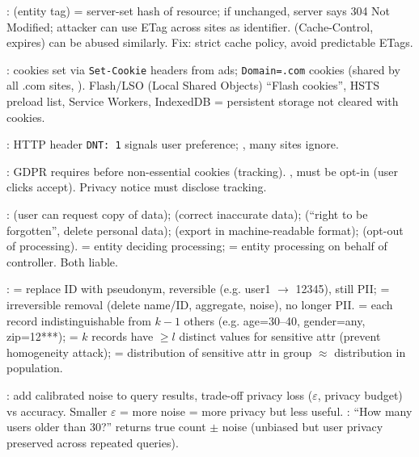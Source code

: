 :  (entity tag) = server-set hash of resource; if unchanged, server says 304 Not Modified; attacker can use ETag across sites as identifier.  (Cache-Control, expires) can be abused similarly. Fix: strict cache policy, avoid predictable ETags.

: cookies set via \texttt{Set-Cookie} headers from ads; \texttt{Domain=.com} cookies (shared by all .com sites, ). Flash/LSO (Local Shared Objects) ``Flash cookies'', HSTS preload list, Service Workers, IndexedDB = persistent storage not cleared with cookies.

: HTTP header \texttt{DNT: 1} signals user preference; , many sites ignore.

: GDPR requires  before non-essential cookies (tracking). , must be opt-in (user clicks accept). Privacy notice must disclose tracking.

:  (user can request copy of data);  (correct inaccurate data);  (``right to be forgotten'', delete personal data);  (export in machine-readable format);  (opt-out of processing).  = entity deciding processing;  = entity processing on behalf of controller. Both liable.

:  = replace ID with pseudonym, reversible (e.g. user1 $\to$ 12345), still PII;  = irreversible removal (delete name/ID, aggregate, noise), no longer PII.  = each record indistinguishable from $k-1$ others (e.g. age=30--40, gender=any, zip=12***);  = $k$ records have $\ge l$ distinct values for sensitive attr (prevent homogeneity attack);  = distribution of sensitive attr in group $\approx$ distribution in population.

: add calibrated noise to query results, trade-off privacy loss ($\varepsilon$, privacy budget) vs accuracy. Smaller $\varepsilon$ = more noise = more privacy but less useful. : ``How many users older than 30?'' returns true count $\pm$ noise (unbiased but user privacy preserved across repeated queries).


